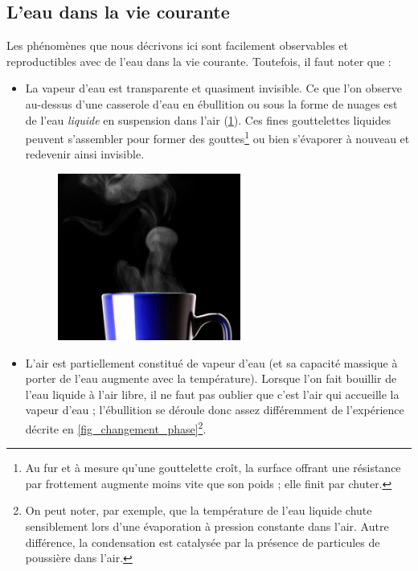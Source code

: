 	\subsection{L’eau dans la vie courante}
	
		Les phénomènes que nous décrivons ici sont facilement observables et reproductibles avec de l’eau dans la vie courante. Toutefois, il faut noter que :
			
			\begin{itemize}
				\item La vapeur d’eau est transparente et quasiment invisible. Ce que l’on observe au-dessus d’une casserole d’eau en ébullition ou sous la forme de nuages est de l’eau \emph{liquide} en suspension dans l’air (\cref{fig_tazaazul}). Ces fines gouttelettes liquides peuvent s’assembler pour former des gouttes\footnote{Au fur et à mesure qu’une gouttelette croît, la surface offrant une résistance par frottement augmente moins vite que son poids ; elle finit par chuter.} ou bien s’évaporer à nouveau et redevenir ainsi invisible.
				
			\begin{figure}
				\begin{center}
					\includegraphics[width=6cm]{images/taza_azul.jpg}
				\end{center}
				\label{fig_tazaazul}
			\end{figure}
				
				\item L’air est partiellement constitué de vapeur d’eau (et sa capacité massique à porter de l’eau augmente avec la température). Lorsque l’on fait bouillir de l’eau liquide à l’air libre, il ne faut pas oublier que c’est l’air qui accueille la vapeur d’eau ; l’ébullition se déroule donc assez différemment de l’expérience décrite en \cref{fig_changement_phase}\footnote{On peut noter, par exemple, que la température de l’eau liquide chute sensiblement lors d’une évaporation à pression constante dans l’air. Autre différence, la condensation est catalysée par la présence de particules de poussière dans l’air.}\nolinebreak.
			\end{itemize}





